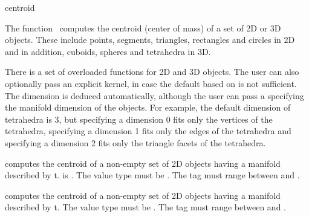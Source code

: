 
\begin{ccRefFunction}{centroid}  

\ccDefinition
  
The function \ccRefName\ computes the centroid (center of mass) of a set
of 2D or 3D objects. These include points, segments, triangles, rectangles and circles in 2D and in addition, cuboids, spheres and tetrahedra in 3D.


There is a set of overloaded  functions for 2D and 3D objects.
The user can also optionally pass an explicit kernel, in case the default based on  is not sufficient. The dimension is deduced automatically, although the user can pass a  specifying the manifold dimension of the objects. For example, the default dimension of tetrahedra is 3, but specifying a dimension 0 fits only the vertices of the tetrahedra, specifying a dimension 1 fits only the edges of the tetrahedra and specifying a dimension 2 fits only the triangle facets of the tetrahedra.

{ computes the centroid of a non-empty set of 2D objects having a manifold described by t.
   is .  The value type must be . The tag must range between  and .
 }

{ computes the centroid of a non-empty set of 2D objects having a manifold described by t.
  The value type must be . The tag must range between  and .
 }


\end{ccRefFunction}
